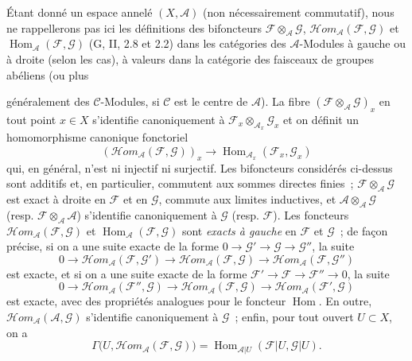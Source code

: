 \begin{env}[4.1.5]
\label{0.4.1.5-fr}
Étant donné un espace annelé $(X,\mathcal{A})$ (non nécessairement
commutatif), nous ne rappellerons pas ici les définitions des bifoncteurs
$\mathcal{F}\otimes_{\mathcal{A}}\mathcal{G}$,
$\mathcal{H}\!om_{\mathcal{A}}(\mathcal{F},\mathcal{G})$ et
$\operatorname{Hom}_{\mathcal{A}}(\mathcal{F},\mathcal{G})$
(G, II, 2.8 et 2.2) dans les catégories des $\mathcal{A}$-Modules à gauche ou
à droite (selon les cas), à valeurs dans la catégorie des faisceaux de groupes
abéliens (ou plus

généralement des $\mathcal{C}$-Modules, si $\mathcal{C}$ est le centre de
$\mathcal{A}$). La fibre
$(\mathcal{F}\otimes_{\mathcal{A}}\mathcal{G})_x$ en tout point $x\in X$
s'identifie canoniquement à
$\mathcal{F}_x\otimes_{\mathcal{A}_x}\mathcal{G}_x$ et on définit un
homomorphisme canonique fonctoriel
\[
  (\mathcal{H}\!om_{\mathcal{A}}(\mathcal{F},\mathcal{G}))_x
  \longrightarrow
  \operatorname{Hom}_{\mathcal{A}_x}(\mathcal{F}_x,\mathcal{G}_x)
\]
qui, en général, n'est ni injectif ni surjectif. Les bifoncteurs considérés
ci-dessus sont additifs et, en particulier, commutent aux sommes directes
finies~; $\mathcal{F}\otimes_{\mathcal{A}}\mathcal{G}$ est exact à droite en
$\mathcal{F}$ et en $\mathcal{G}$, commute aux limites inductives, et
$\mathcal{A}\otimes_{\mathcal{A}}\mathcal{G}$
(resp. $\mathcal{F}\otimes_{\mathcal{A}}\mathcal{A}$) s'identifie
canoniquement à $\mathcal{G}$ (resp. $\mathcal{F}$). Les foncteurs
$\mathcal{H}\!om_{\mathcal{A}}(\mathcal{F},\mathcal{G})$ et
$\operatorname{Hom}_{\mathcal{A}}(\mathcal{F},\mathcal{G})$ sont
\emph{exacts à gauche} en $\mathcal{F}$ et $\mathcal{G}$~; de façon précise,
si on a une suite exacte de la forme
$0\to\mathcal{G}'\to\mathcal{G}\to\mathcal{G}''$, la suite
\[
  0\longrightarrow
  \mathcal{H}\!om_{\mathcal{A}}(\mathcal{F},\mathcal{G}')
  \longrightarrow
  \mathcal{H}\!om_{\mathcal{A}}(\mathcal{F},\mathcal{G})
  \longrightarrow
  \mathcal{H}\!om_{\mathcal{A}}(\mathcal{F},\mathcal{G}'')
\]
est exacte, et si on a une suite exacte de la forme
$\mathcal{F}'\to\mathcal{F}\to\mathcal{F}''\to0$, la suite
\[
  0\longrightarrow
  \mathcal{H}\!om_{\mathcal{A}}(\mathcal{F}'',\mathcal{G})
  \longrightarrow
  \mathcal{H}\!om_{\mathcal{A}}(\mathcal{F},\mathcal{G})
  \longrightarrow
  \mathcal{H}\!om_{\mathcal{A}}(\mathcal{F}',\mathcal{G})
\]
est exacte, avec des propriétés analogues pour le foncteur
$\operatorname{Hom}$. En outre,
$\mathcal{H}\!om_{\mathcal{A}}(\mathcal{A},\mathcal{G})$ s'identifie
canoniquement à $\mathcal{G}$~; enfin, pour tout ouvert $U\subset X$, on a
\[
  \Gamma\bigl(U,\mathcal{H}\!om_{\mathcal{A}}(\mathcal{F},\mathcal{G})\bigr)
  =
  \operatorname{Hom}_{\mathcal{A}|U}(\mathcal{F}|U,\mathcal{G}|U).
\]


\end{env}
